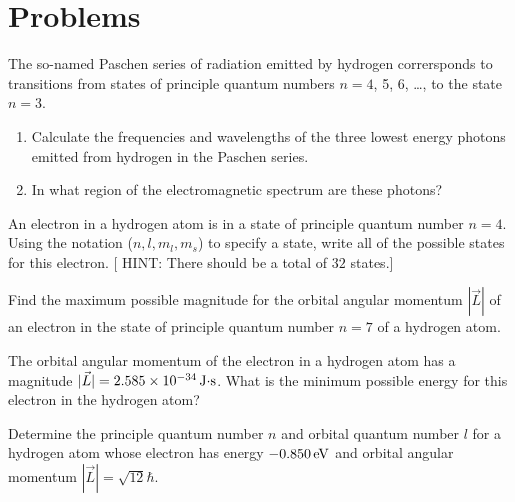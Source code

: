 \newpage

\section*{Problems}




\begin{problem}
  The so-named Paschen series of radiation emitted by hydrogen
  corrersponds to transitions from states of principle quantum numbers
  $n = 4$, 5, 6, \dots, to the state $n = 3$.
\begin{enumerate}
\item Calculate the frequencies and wavelengths of the three lowest
  energy photons emitted from hydrogen in the Paschen series.
\item In what region of the electromagnetic spectrum are these
  photons?
\end{enumerate}
\end{problem}


\begin{problem}
  An electron in a hydrogen atom is in a state of principle quantum
  number $n = 4$.  Using the notation ($n, l, m_l, m_s$) to specify a
  state, write all of the possible states for this electron. [ HINT:
  There should be a total of $32$ states.]
\end{problem}


\begin{problem}
  Find the maximum possible magnitude for the orbital angular momentum
  $|\vec{L}|$ of an electron in the state of principle quantum number
  $n = 7$ of a hydrogen atom.
\end{problem}


\begin{problem}
  The orbital angular momentum of the electron in a hydrogen atom has
  a magnitude $|\vec{L}| = 2.585 \times 10^{-34}
  \,\mbox{J$\cdot$s}$. What is the minimum possible energy for this
  electron in the hydrogen atom?
\end{problem}


\begin{problem}
  Determine the principle quantum number $n$ and orbital quantum
  number $l$ for a hydrogen atom whose electron has energy $-0.850
  \,\mbox{eV}$ and orbital angular momentum $|\vec{L}| = \sqrt{12}
  \hbar$.
\end{problem}

